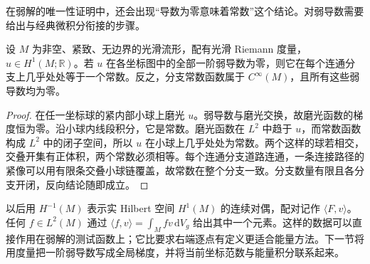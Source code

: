 在弱解的唯一性证明中，还会出现“导数为零意味着常数”这个结论。对弱导数需要给出与经典微积分衔接的步骤。

\begin{lemma}[弱导数为零的函数]\label{b2:lem:28-zero-gradient}
设 \(M\) 为非空、紧致、无边界的光滑流形，配有光滑 Riemann 度量，\(u\in H^1(M;\mathbb R)\)。若 \(u\) 在各坐标图中的全部一阶弱导数为零，则它在每个连通分支上几乎处处等于一个常数。反之，分支常数函数属于 \(C^\infty(M)\)，且所有这些弱导数均为零。
\end{lemma}
\begin{proof}
在任一坐标球的紧内部小球上磨光 \(u\)。弱导数与磨光交换，故磨光函数的梯度恒为零。沿小球内线段积分，它是常数。磨光函数在 \(L^2\) 中趋于 \(u\)，而常数函数构成 \(L^2\) 中的闭子空间，所以 \(u\) 在小球上几乎处处为常数。两个这样的球若相交，交叠开集有正体积，两个常数必须相等。每个连通分支道路连通，一条连接路径的紧像可以用有限条交叠小球链覆盖，故常数在整个分支一致。分支数量有限且各分支开闭，反向结论随即成立。
\end{proof}

以后用 \(H^{-1}(M)\) 表示实 Hilbert 空间 \(H^1(M)\) 的连续对偶，配对记作 \(\langle F,v\rangle\)。任何 \(f\in L^2(M)\) 通过 \(\langle f,v\rangle=\int_Mfv\,\mathrm dV_g\) 给出其中一个元素。这样的数据可以直接作用在弱解的测试函数上；它比要求右端逐点有定义更适合能量方法。下一节将用度量把一阶弱导数写成全局梯度，并将当前坐标范数与能量积分联系起来。
